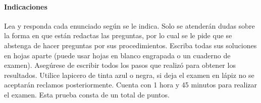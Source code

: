 \begin{center}
  {\large \thepartial} \hfill
  {\large \thecycle} %
\end{center}
  \paragraph{Indicaciones}
  Lea y responda cada enunciado según se le indica. 
  Solo se atenderán dudas sobre la forma en que están redactas las preguntas, 
  por lo cual se le pide que se abstenga de hacer preguntas por sus 
  procedimientos.
  Escriba todas sus soluciones en hojas aparte (puede usar hojas en blanco
  engrapada o un cuaderno de examen).
  Asegúrese de escribir todos los pasos que realizó para obtener los
  resultados.
  Utilice lapicero de tinta azul o negra, si deja el examen en lápiz no se
  aceptarán reclamos posteriormente.
  Cuenta con 1 hora y 45 minutos para realizar el examen.
  Esta prueba consta de un total de  puntos.

